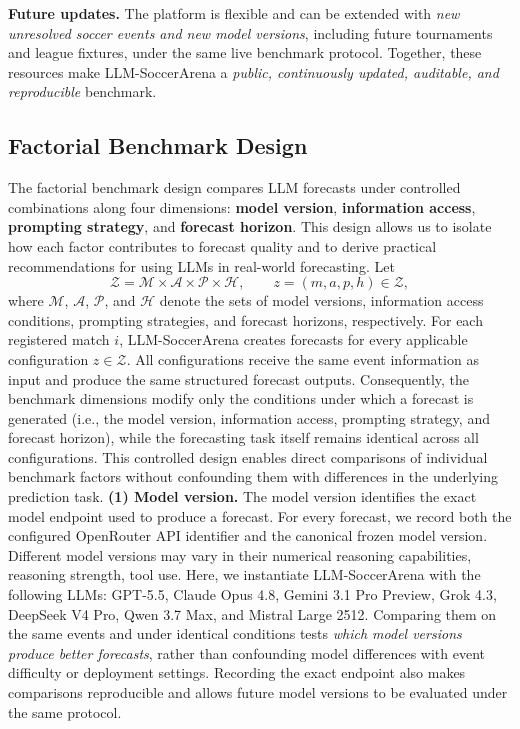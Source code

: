 \documentclass[sigconf,nonacm]{acmart}
\newcommand{\arena}{\mbox{LLM-SoccerArena}\xspace}
\newcommand{\circnum}[2][tikzblue]{%
\tikz[baseline=-0.55ex]{
\node[
    circle,
    draw=#1,
    text=#1,
    line width=0.35pt,
    minimum size=1.0em,
    inner sep=0pt,
    font=\bfseries\fontsize{6.5}{6.5}\selectfont
] {#2};
}%
}
\begin{document}
\textbf{Future updates.} The platform is flexible and can be extended with \emph{new unresolved soccer events and new model versions}, including future tournaments and league fixtures, under the same live benchmark protocol. Together, these resources make \arena a \emph{public, continuously updated, auditable, and reproducible} benchmark. 

\subsection{Factorial Benchmark Design}
\label{sec:factorial-design}
The factorial benchmark design compares LLM forecasts under controlled combinations along four dimensions: \textbf{\circnum[tikzgreen]{1} model version}, \textbf{\circnum[tikzgreen]{2} information access}, \textbf{\circnum[tikzgreen]{3} prompting strategy}, and \textbf{\circnum[tikzgreen]{4} forecast horizon}. This design allows us to isolate how each factor contributes to forecast quality and to derive practical recommendations for using LLMs in real-world forecasting.
Let
\begin{equation}
\mathcal{Z}
=
\mathcal{M}\times\mathcal{A}\times\mathcal{P}\times\mathcal{H},
\qquad
z=(m,a,p,h)\in\mathcal{Z},
\label{eq:forecast-configurations}
\end{equation}
where $\mathcal{M}$, $\mathcal{A}$, $\mathcal{P}$, and $\mathcal{H}$
denote the sets of model versions, information access conditions,
prompting strategies, and forecast horizons, respectively.
For each registered match $i$, \arena creates forecasts for every
applicable configuration $z\in\mathcal{Z}$. All configurations receive
the same event information as input and produce the same structured
forecast outputs. Consequently, the benchmark dimensions modify only
the conditions under which a forecast is generated (i.e., the model
version, information access, prompting strategy, and forecast horizon),
while the forecasting task itself remains identical across all
configurations. This controlled design enables direct comparisons of
individual benchmark factors without confounding them with differences
in the underlying prediction task.
\textbf{(1) Model version.}
The model version identifies the exact model endpoint used to produce a forecast. For every forecast, we
record both the configured OpenRouter API identifier and the canonical frozen model version. Different model versions may vary in their numerical reasoning capabilities, reasoning strength, tool use. Here, we instantiate \arena with the following LLMs: GPT-5.5, Claude Opus 4.8, Gemini 3.1 Pro Preview, Grok 4.3, DeepSeek V4 Pro, Qwen 3.7 Max, and Mistral Large 2512. Comparing them on the same events and under identical conditions tests \emph{which model versions produce better forecasts}, rather than confounding model differences with event difficulty or deployment settings. Recording the exact endpoint also makes comparisons reproducible and allows future model versions to be evaluated under the same protocol. 
\end{document}
